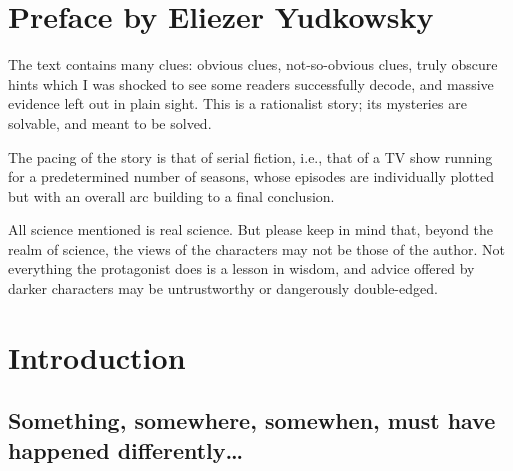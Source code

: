 \chapter*{Preface by Eliezer Yudkowsky}

The text contains many clues: obvious clues, not-so-obvious clues, truly obscure hints which I was shocked to see some readers successfully decode, and massive evidence left out in plain sight. This is a rationalist story; its mysteries are solvable, and meant to be solved.

The pacing of the story is that of serial fiction, i.e., that of a TV show running for a predetermined number of seasons, whose episodes are individually plotted but with an overall arc building to a final conclusion.


All science mentioned is real science. But please keep in mind that, beyond the realm of science, the views of the characters may not be those of the author. Not everything the protagonist does is a lesson in wisdom, and advice offered by darker characters may be untrustworthy or dangerously double-edged.

\chapter*{Introduction}

\section*{Something, somewhere, somewhen, must have happened differently…}

